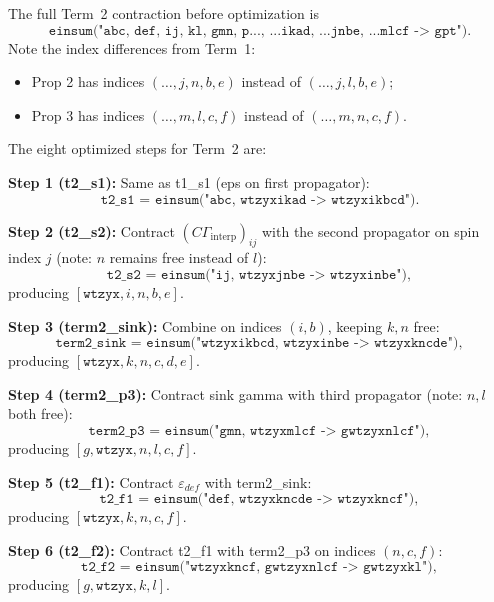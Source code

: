 \documentclass[11pt,a4paper]{article}
\newcommand{\eps}{\varepsilon}
\newcommand{\Gint}{\Gamma_{\text{interp}}}
\newcommand{\Cmat}{C}
\begin{document}
The full Term~2 contraction before optimization is
\begin{equation}
  \texttt{einsum("abc, def, ij, kl, gmn, p..., ...ikad, ...jnbe, ...mlcf -> gpt")}.
\end{equation}
Note the index differences from Term~1:
\begin{itemize}
  \item Prop 2 has indices $(\dots,j,n,b,e)$ instead of $(\dots,j,l,b,e)$;
  \item Prop 3 has indices $(\dots,m,l,c,f)$ instead of $(\dots,m,n,c,f)$.
\end{itemize}

The eight optimized steps for Term~2 are:

\medskip\noindent
\textbf{Step 1 (t2\_s1):} Same as t1\_s1 (eps on first propagator):
\begin{equation}
  \texttt{t2\_s1 = einsum("abc, wtzyxikad -> wtzyxikbcd")}.
\end{equation}

\medskip\noindent
\textbf{Step 2 (t2\_s2):} Contract $(\Cmat\Gint)_{ij}$ with the second propagator
on spin index $j$ (note: $n$ remains free instead of $l$):
\begin{equation}
  \texttt{t2\_s2 = einsum("ij, wtzyxjnbe -> wtzyxinbe")},
\end{equation}
producing $[\texttt{wtzyx},i,n,b,e]$.

\medskip\noindent
\textbf{Step 3 (term2\_sink):} Combine on indices $(i,b)$, keeping $k,n$ free:
\begin{equation}
  \texttt{term2\_sink = einsum("wtzyxikbcd, wtzyxinbe -> wtzyxkncde")},
\end{equation}
producing $[\texttt{wtzyx},k,n,c,d,e]$.

\medskip\noindent
\textbf{Step 4 (term2\_p3):} Contract sink gamma with third propagator (note:
$n,l$ both free):
\begin{equation}
  \texttt{term2\_p3 = einsum("gmn, wtzyxmlcf -> gwtzyxnlcf")},
\end{equation}
producing $[g,\texttt{wtzyx},n,l,c,f]$.

\medskip\noindent
\textbf{Step 5 (t2\_f1):} Contract $\eps_{def}$ with term2\_sink:
\begin{equation}
  \texttt{t2\_f1 = einsum("def, wtzyxkncde -> wtzyxkncf")},
\end{equation}
producing $[\texttt{wtzyx},k,n,c,f]$.

\medskip\noindent
\textbf{Step 6 (t2\_f2):} Contract t2\_f1 with term2\_p3 on indices $(n,c,f)$:
\begin{equation}
  \texttt{t2\_f2 = einsum("wtzyxkncf, gwtzyxnlcf -> gwtzyxkl")},
\end{equation}
producing $[g,\texttt{wtzyx},k,l]$.
\end{document}
